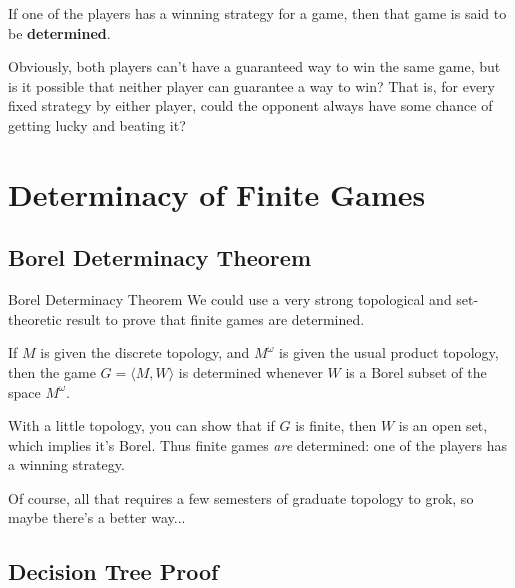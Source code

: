 \documentclass{beamer}
\theoremstyle{theorem}
\theoremstyle{definition}
\newcommand{\<}{\langle}
\renewcommand{\>}{\rangle}
\newcommand{\vpause}{\pause\vspace{1em}}
\newcommand{\term}[1]{\textbf{#1}}
\begin{document}
\begin{frame}
  \begin{definition}
    If one of the players has a winning strategy for a game, then that
    game is said to be \term{determined}.
  \end{definition}

  Obviously, both players can't have a guaranteed way to win the same
  game, but is it possible that neither player can guarantee a way to win?
  That is, for every fixed strategy by either player, could the opponent
  always have some chance of getting lucky and beating it?
\end{frame}

\section{Determinacy of Finite Games}

\subsection{Borel Determinacy Theorem}

\begin{frame}{Borel Determinacy Theorem}
  We could use a very strong topological and set-theoretic result to prove
  that finite games are determined.

  \begin{theorem}
    If $M$ is given the discrete topology, and $M^\omega$ is given the usual
    product topology, then the game $G=\<M,W\>$ is determined whenever $W$
    is a Borel subset of the space $M^\omega$.
  \end{theorem}

  \pause

  With a little topology, you can show that if $G$ is finite, then $W$ is
  an open set, which implies it's Borel. Thus finite games \textit{are}
  determined: one of the players has a winning strategy.

  \vpause

  Of course, all that requires a few semesters of graduate topology to grok,
  so maybe there's a better way...
\end{frame}

\subsection{Decision Tree Proof}
\end{document}
